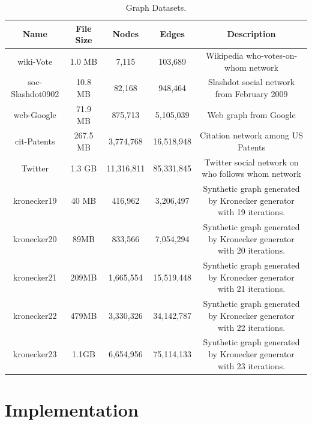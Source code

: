 \documentclass[12pt,conference,letterpaper]{IEEEtran}
\begin{document}
\begin{table}[!t]
\renewcommand{\arraystretch}{1.3}
\centering
\begin{tabular}{|c|c|c|c|c|}
\hline
\bfseries Name & \bfseries File Size & \bfseries Nodes & \bfseries Edges & \bfseries Description\\
\hline
wiki-Vote & 1.0 MB & 7,115 & 103,689 & Wikipedia who-votes-on-whom network\\
\hline
soc-Slashdot0902 & 10.8 MB & 82,168 & 948,464 & Slashdot social network from February 2009\\
\hline
web-Google & 71.9 MB & 875,713 & 5,105,039 & Web graph from Google\\
\hline
cit-Patents & 267.5 MB & 3,774,768 & 16,518,948 & Citation network among US Patents\\
\hline
Twitter & 1.3 GB & 11,316,811 & 85,331,845 & Twitter social network on who follows whom network\\
\hline
kronecker19 & 40 MB & 416,962 & 3,206,497 & Synthetic graph generated by Kronecker generator
 with 19 iterations.\\
\hline
kronecker20 & 89MB & 833,566 & 7,054,294 & Synthetic graph generated by Kronecker generator
 with 20 iterations.\\
\hline
kronecker21 & 209MB & 1,665,554 & 15,519,448 & Synthetic graph generated by Kronecker generator
 with 21 iterations.\\
\hline
kronecker22 & 479MB & 3,330,326 & 34,142,787 & Synthetic graph generated by Kronecker generator
 with 22 iterations.\\
\hline
kronecker23 & 1.1GB & 6,654,956 & 75,114,133 & Synthetic graph generated by Kronecker generator
 with 23 iterations.\\
\hline
\end{tabular}
\caption{Graph Datasets.}
\label{tab:attribs_graphs}
\end{table}





\section{Implementation}
\label{sec:impl}
\end{document}
